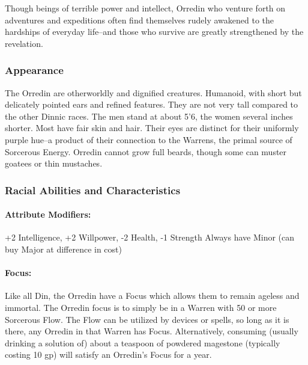 \documentclass[oneside,11pt,english]{book}
\begin{document}
Though beings of terrible power and intellect, Orredin who venture forth on adventures and expeditions 
often find themselves rudely awakened to the hardships of everyday life--and those who survive are 
greatly strengthened by the revelation. 
\subsubsection*{Appearance} 
The Orredin are otherworldly and dignified creatures. Humanoid, with short but delicately pointed ears 
and refined features. They are not very tall compared to the other Dinnic races. The men stand at about 
5’6, the women several inches shorter. Most have fair skin and hair. Their eyes are distinct for their 
uniformly purple hue--a product of their connection to the Warrens, the primal source of Sorcerous 
Energy. Orredin cannot grow full beards, though some can muster goatees or thin mustaches. 

 

 

\subsubsection*{Racial Abilities and Characteristics} 

 

\paragraph{Attribute Modifiers:} +2 Intelligence, +2 Willpower, -2 Health, -1 Strength 
Always have  Minor (can buy  Major at difference in cost)

\paragraph{Focus:} Like all Din, the Orredin have a Focus which allows them to remain ageless and immortal. The 
Orredin focus is to simply be in a Warren with 50 or more Sorcerous Flow. The Flow can be utilized by 
devices or spells, so long as it is there, any Orredin in that Warren has Focus. Alternatively, consuming 
(usually drinking a solution of) about a teaspoon of powdered magestone (typically costing 10 gp) will 
satisfy an Orredin's Focus for a year. 
\end{document}
